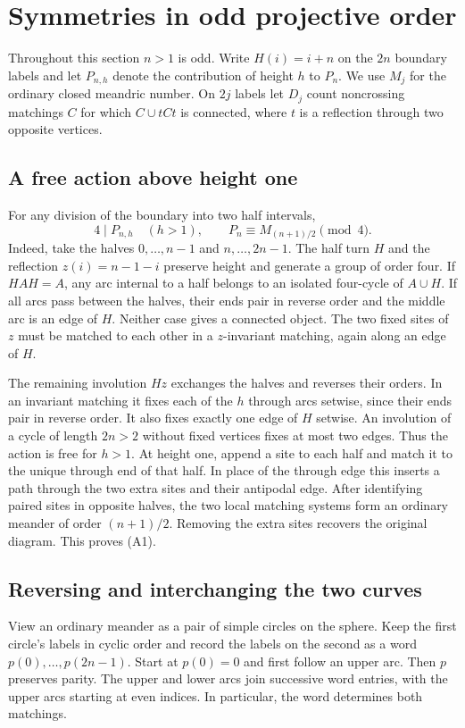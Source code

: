 \section{Symmetries in odd projective order}\label{app:residue}

Throughout this section \(n>1\) is odd. Write \(H(i)=i+n\) on the
\(2n\) boundary labels and let \(P_{n,h}\) denote the contribution of
height \(h\) to \(P_n\). We use \(M_j\) for the ordinary closed
meandric number. On \(2j\) labels let \(D_j\) count noncrossing
matchings \(C\) for which \(C\cup tCt\) is connected, where \(t\)
is a reflection through two opposite vertices.

\subsection*{A free action above height one}
For any division of the boundary into two half intervals,
\[
  4\mid P_{n,h}\quad(h>1),\qquad
  P_n\equiv M_{(n+1)/2}\pmod 4.                         \tag{A1}
\]
Indeed, take the halves \(0,\dots,n-1\) and \(n,\dots,2n-1\).
The half turn \(H\) and the reflection \(z(i)=n-1-i\) preserve
height and generate a group of order four. If \(HAH=A\), any arc
internal to a half belongs to an isolated four-cycle of \(A\cup H\).
If all arcs pass between the halves, their ends pair in reverse
order and the middle arc is an edge of \(H\). Neither case gives
a connected object. The two fixed sites of \(z\) must be matched
to each other in a \(z\)-invariant matching, again along an edge of
\(H\).

The remaining involution \(Hz\) exchanges the halves and reverses
their orders. In an invariant matching it fixes each of the \(h\)
through arcs setwise, since their ends pair in reverse order. It
also fixes exactly one edge of \(H\) setwise. An involution of a
cycle of length \(2n>2\) without fixed vertices fixes at most two
edges. Thus the action is free for \(h>1\). At height one, append
a site to each half and match it to the unique through end of that
half. In place of the through edge this inserts a path through the
two extra sites and their antipodal edge. After identifying paired
sites in opposite halves, the two local matching systems form an
ordinary meander of order \((n+1)/2\). Removing the extra sites
recovers the original diagram. This proves (A1).

\subsection*{Reversing and interchanging the two curves}
View an ordinary meander as a pair of simple circles on the sphere.
Keep the first circle's labels in cyclic order and record the labels
on the second as a word \(p(0),\ldots,p(2n-1)\). Start at \(p(0)=0\)
and first follow an upper arc. Then \(p\) preserves parity. The upper
and lower arcs join successive word entries, with the upper arcs
starting at even indices. In particular, the word determines both
matchings.

